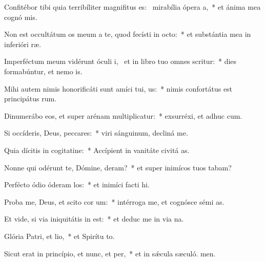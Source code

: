 \item Confitébor tibi quia terribíliter magnifitus es:~\pscross{} mirabília ópera a,~* et ánima mea cognó mis.
\item Non est occultátum os meum a te, quod fecísti in octo:~* et substántia mea in inferióri ræ.
\item Imperféctum meum vidérunt óculi i,~\pscross{} et in libro tuo omnes scritur:~* dies formabúntur, et nemo  is.
\item Mihi autem nimis honorificáti sunt amíci tui, us:~* nimis confortátus est principátus rum.
\item Dinumerábo eos, et super arénam multiplicatur:~* exsurréxi, et adhuc  cum.
\item Si occíderis, Deus, peccares:~* viri sánguinum, decliná  me.
\item Quia dícitis in cogitatine:~* Accípient in vanitáte civitá as.
\item Nonne qui odérunt te, Dómine, deram?~* et super inimícos tuos tabam?
\item Perfécto ódio óderam los:~* et inimíci facti  hi.
\item Proba me, Deus, et scito cor um:~* intérroga me, et cognósce sémi as.
\item Et vide, si via iniquitátis in  est:~* et deduc me in via na.
\item Glória Patri, et lio,~* et Spirítu to.
\item Sicut erat in princípio, et nunc, et per,~* et in sǽcula sæculó. men.
